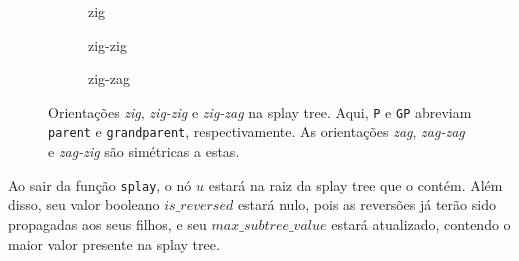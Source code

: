 \begin{figure}
    \centering
    \begin{subfigure}[b]{0.3\textwidth}
        \centering
        \caption{zig}
    \end{subfigure}
    \hfill
    \begin{subfigure}[b]{0.3\textwidth}
        \centering
        \caption{zig-zig}
    \end{subfigure}
    \hfill
    \begin{subfigure}[b]{0.3\textwidth}
        \centering
        \caption{zig-zag}
    \end{subfigure}
    \caption{Orientações \textit{zig}, \textit{zig-zig} e \textit{zig-zag} na splay tree. Aqui, \texttt{P} e \texttt{GP} abreviam \texttt{parent} e \texttt{grandparent}, respectivamente. As orientações  \textit{zag}, \textit{zag-zag} e \textit{zag-zig} são simétricas a estas.}
    \label{fig:zig-oris}
\end{figure}


Ao sair da função \texttt{splay}, o nó $u$ estará na raiz da splay tree que o contém. Além disso, seu valor booleano $is\_reversed$ estará nulo, pois as reversões já terão sido propagadas aos seus filhos, e seu $max\_subtree\_value$ estará atualizado, contendo o maior valor presente na splay tree.

